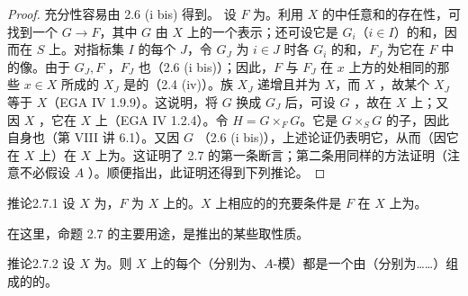 \begin{proof}
充分性容易由 2.6 (i bis) 得到。
设 $F$ 为。利用 $X$ 的中任意和的存在性，可找到一个 $G\to F$，其中 $G$ 由 $X$ 上的一个表示；还可设它是 $G_i$（$i\in I$）的和，因而在 $S$ 上。对指标集 $I$ 的每个 $J$，令 $G_J$ 为 $i\in J$ 时各 $G_i$ 的和，$F_J$ 为它在 $F$ 中的像。由于 $G_J,F$ ，$F_J$ 也（2.6 (i bis)）；因此，$F$ 与 $F_J$ 在 $x$ 上方的处相同的那些 $x\in X$ 所成的 $X_J$ 是的（2.4 (iv)）。族 $X_J$ 递增且并为 $X$，而 $X$ ，故某个 $X_J$ 等于 $X$（EGA IV 1.9.9）。这说明，将 $G$ 换成 $G_J$ 后，可设 $G$ ，故在 $X$ 上；又因 $X$ ，它在 $X$ 上（EGA IV 1.2.4）。令 $H=G\times_FG$。它是 $G\times_SG$ 的子，因此自身也（第 VIII 讲 6.1）。又因 $G$ （2.6 (i bis)），上述论证仍表明它，从而（因它在 $X$ 上）在 $X$ 上为。这证明了 2.7 的第一条断言；第二条用同样的方法证明（注意不必假设 $A$ ）。顺便指出，此证明还得到下列推论。
\end{proof}
\begin{SGAresult}{推论}{2.7.1}
设 $X$ 为，$F$ 为 $X$ 上的。$X$ 上相应的的充要条件是 $F$ 在 $X$ 上为。
\end{SGAresult}
在这里，命题 2.7 的主要用途，是推出的某些取性质。
\begin{SGAresult}{推论}{2.7.2}
设 $X$ 为。则 $X$ 上的每个（分别为、$A$-模）都是一个由（分别为……）组成的的。
\end{SGAresult}
